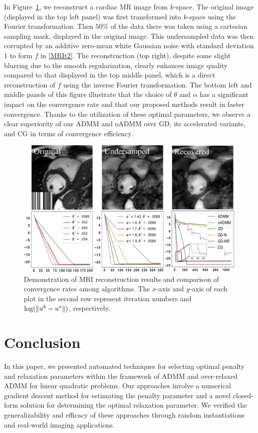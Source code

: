 \documentclass[letterpaper]{article} %
\begin{document}
In Figure~\ref{fig:MRI}, we reconstruct a cardiac MR image from $k$-space. The original image (displayed in the top left panel) was first transformed into $k$-space using the Fourier transformation. Then $50\%$ of the data there was taken using a cartesian sampling mask, displayed in the original image. This undersampled data was then corrupted by an additive zero-mean white Gaussian noise with standard deviation $1$ to form $f$ in \eqref{MRIt2}. The reconstruction (top right), despite some slight blurring due to the smooth regularization, clearly enhances image quality compared to that displayed in the top middle panel, which is a direct reconstruction of $f$ using the inverse Fourier transformation. The bottom left and middle panels of this figure illustrate that the choice of $\theta$ and $\alpha$ has a significant impact on the convergence rate and that our proposed methods result in faster convergence. Thanks to the utilization of these optimal parameters, we observe a clear superiority of our ADMM and oADMM over GD, its accelerated variants, and CG in terms of convergence efficiency.

\begin{figure}[t]
\centering
\includegraphics[width=0.97\linewidth]{Figures/n12.pdf}
\vspace{-7pt}
\caption{{Demonstration of MRI reconstruction results and comparison of convergence rates among algorithms. The $x$-axis and $y$-axis of each plot in the second row represent iteration numbers and ${\rm{log}}(\|u^k - u^*\|)$, respectively.} }
\label{fig:MRI}
\vspace{-13pt}
\end{figure}

\section{Conclusion}
In this paper, we presented automated techniques for selecting optimal penalty and relaxation parameters within the framework of ADMM and over-relaxed ADMM for linear quadratic problems. Our approaches involve a numerical gradient descent method for estimating the penalty parameter and a novel closed-form solution for determining the optimal relaxation parameter. We verified the generalizability and efficacy of these approaches through random instantiations and real-world imaging applications.
\end{document}
